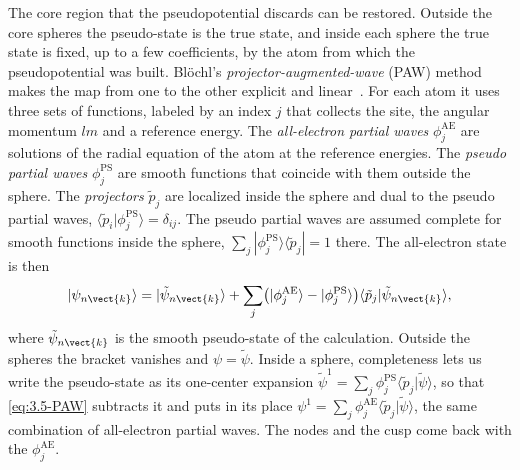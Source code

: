 The core region that the pseudopotential discards can be restored. Outside the core spheres the pseudo-state is the true state, and inside each sphere the true state is fixed, up to a few coefficients, by the atom from which the pseudopotential was built. Bl\"ochl's \emph{projector-augmented-wave} (PAW) method makes the map from one to the other explicit and linear~\cite{blochl1994projector}. For each atom it uses three sets of functions, labeled by an index $j$ that collects the site, the angular momentum $lm$ and a reference energy. The \emph{all-electron partial waves} $\phi^{\mathrm{AE}}_j$ are solutions of the radial equation of the atom at the reference energies. The \emph{pseudo partial waves} $\phi^{\mathrm{PS}}_j$ are smooth functions that coincide with them outside the sphere. The \emph{projectors} $\tilde p_j$ are localized inside the sphere and dual to the pseudo partial waves, $\langle\tilde p_i|\phi^{\mathrm{PS}}_j\rangle = \delta_{ij}$. The pseudo partial waves are assumed complete for smooth functions inside the sphere, $\sum_j|\phi^{\mathrm{PS}}_j\rangle\langle\tilde p_j| = 1$ there. The all-electron state is then
\begin{equation}
  |\psi_{n\vect{k}}\rangle = |\tilde\psi_{n\vect{k}}\rangle + \sum_j\bigl(|\phi^{\mathrm{AE}}_j\rangle - |\phi^{\mathrm{PS}}_j\rangle\bigr)\langle\tilde p_j|\tilde\psi_{n\vect{k}}\rangle ,
  \label{eq:3.5-PAW}
\end{equation}
where $\tilde\psi_{n\vect{k}}$ is the smooth pseudo-state of the calculation. Outside the spheres the bracket vanishes and $\psi = \tilde\psi$. Inside a sphere, completeness lets us write the pseudo-state as its one-center expansion $\tilde\psi^1 = \sum_j\phi^{\mathrm{PS}}_j\langle\tilde p_j|\tilde\psi\rangle$, so that \cref{eq:3.5-PAW} subtracts it and puts in its place $\psi^1 = \sum_j\phi^{\mathrm{AE}}_j\langle\tilde p_j|\tilde\psi\rangle$, the same combination of all-electron partial waves. The nodes and the cusp come back with the $\phi^{\mathrm{AE}}_j$.


